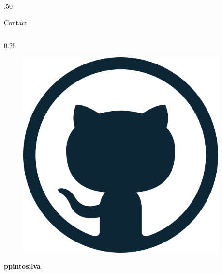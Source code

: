 \documentclass[final]{beamer}
\newlength{\sepwidth}
\newlength{\colwidth}
\newcommand{\separatorcolumn}{\begin{column}{\sepwidth}\end{column}}
\begin{document}
\begin{frame}[t]
\begin{columns}[t]
\begin{column}{\colwidth}
\begin{columns}[c]
\begin{column}{.50\colwidth}
\begin{alertblock}{Contact}
\begin{columns}[t]
          \begin{column}{0.25\colwidth}

            \begin{figure}
              \centering
              \includegraphics[width=0.2\linewidth]{github.png}
              \label{fig:github}
            \end{figure}

            \centering\textbf{ppintosilva}

          \end{column}%

        \end{columns}

      \end{alertblock}

    \end{column}%
  \end{columns}


\end{column}

\separatorcolumn
\end{columns}
\end{frame}
\end{document}
